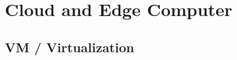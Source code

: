 \section{Cloud and Edge Computer}\label{sec:cloud-and-edge-computing}

\subsection{VM / Virtualization}